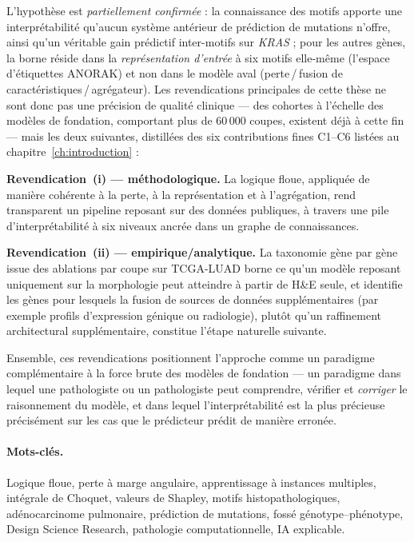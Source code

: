L'hypothèse est \emph{partiellement confirmée} : la connaissance
des motifs apporte une interprétabilité qu'aucun système
antérieur de prédiction de mutations n'offre, ainsi qu'un
véritable gain prédictif inter-motifs sur \textit{KRAS} ; pour
les autres gènes, la borne réside dans la \emph{représentation
d'entrée} à six motifs elle-même (l'espace d'étiquettes ANORAK)
et non dans le modèle aval
(perte\,/\,fusion de caractéristiques\,/\,agrégateur).
Les revendications principales de cette thèse ne sont donc pas
une précision de qualité clinique --- des cohortes à l'échelle
des modèles de fondation, comportant plus de 60\,000 coupes,
existent déjà à cette fin --- mais les deux suivantes,
distillées des six contributions fines C1--C6 listées au
chapitre~\ref{ch:introduction} :

\textbf{Revendication~(i) --- méthodologique.}
La logique floue, appliquée de manière cohérente à la perte, à
la représentation et à l'agrégation, rend transparent un
pipeline reposant sur des données publiques, à travers une pile
d'interprétabilité à six niveaux ancrée dans un graphe de
connaissances.

\textbf{Revendication~(ii) --- empirique/analytique.}
La taxonomie gène par gène issue des ablations par coupe sur
TCGA-LUAD borne ce qu'un modèle reposant uniquement sur la
morphologie peut atteindre à partir de H\&E seule, et identifie
les gènes pour lesquels la fusion de sources de données
supplémentaires (par exemple profils d'expression génique ou
radiologie), plutôt qu'un raffinement architectural
supplémentaire, constitue l'étape naturelle suivante.

Ensemble, ces revendications positionnent l'approche comme un
paradigme complémentaire à la force brute des modèles de
fondation --- un paradigme dans lequel une pathologiste ou un
pathologiste peut comprendre, vérifier et \emph{corriger} le
raisonnement du modèle, et dans lequel l'interprétabilité est la
plus précieuse précisément sur les cas que le prédicteur prédit
de manière erronée.

\paragraph{Mots-clés.}
Logique floue, perte à marge angulaire, apprentissage à
instances multiples, intégrale de Choquet, valeurs de Shapley,
motifs histopathologiques, adénocarcinome pulmonaire, prédiction
de mutations, fossé génotype--phénotype, Design Science Research,
pathologie computationnelle, IA explicable.
